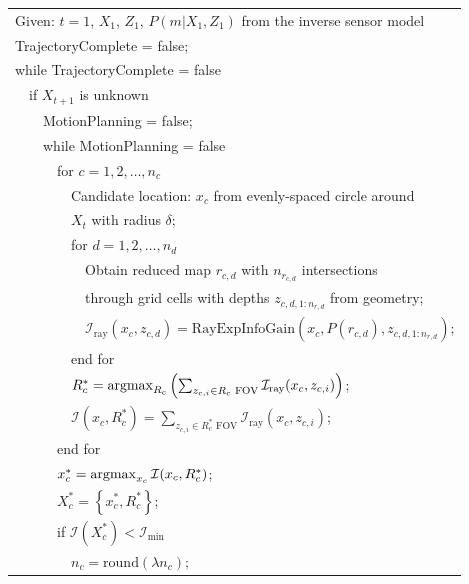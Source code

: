 \documentclass[letterpaper, 10pt]{ieeeconf}
\newcommand{\braces}[1]{\ensuremath{\left\{ #1 \right\}}}
\newcommand{\argmax}{\operatornamewithlimits{argmax}}
\begin{document}
\begin{table}
\begin{tabular}{ l }
  Given: $t=1$, $X_{1}$, $Z_{1}$, $P(m|X_{1},Z_{1})$ from the inverse sensor model\\
  TrajectoryComplete = false;\\
  while TrajectoryComplete = false\\
  \ \ if $X_{t+1}$ is unknown\\
  \ \ \ \ MotionPlanning = false;\\
  \ \ \ \ while MotionPlanning = false\\
  \ \ \ \ \ \ for $c = 1,2,\ldots,n_c$\\
  \ \ \ \ \ \ \ \ Candidate location: $x_{c}$ from evenly-spaced circle around\\
  \ \ \ \ \ \ \ \ $X_t$ with radius $\delta$;\\
  \ \ \ \ \ \ \ \ for $d=1,2,\ldots,n_d$\\
  \ \ \ \ \ \ \ \ \ \ Obtain reduced map $r_{c,d}$ with $n_{r_{c,d}}$ intersections\\
  \ \ \ \ \ \ \ \ \ \ through grid cells with depths $z_{c,d,1:n_{r,d}}$ from geometry;\\
  \ \ \ \ \ \ \ \ \ \ $\mathcal I_\text{ray}(x_c,z_{c,d})=\text{RayExpInfoGain}(x_c,P(r_{c,d}),z_{c,d,1:n_{r,d}})$;\\
  \ \ \ \ \ \ \ \ end for\\
  \ \ \ \ \ \ \ \ $R_{c}^*=\argmax_{R_c}\left(\sum_{z_{c,i}\in R_c \text{ FOV}}\mathcal I_\text{ray}(x_c,z_{c,i})\right)$;\\%
  \ \ \ \ \ \ \ \ $\mathcal I(x_c,R_c^*)=\sum_{z_{c,i}\in R_c^* \text{ FOV}}\mathcal I_\text{ray}(x_c,z_{c,i})$;\\%
  \ \ \ \ \ \ end for\\
  \ \ \ \ \ \ $x_c^*=\argmax_{x_c}\mathcal I(x_c,R_c^*)$;\\
  \ \ \ \ \ \ $X_c^*=\braces{x_c^*,R_c^*}$;\\
  \ \ \ \ \ \ if $\mathcal I(X_c^*)<\mathcal I_\text{min}$\\
  \ \ \ \ \ \ \ \ $n_c=\text{round}(\lambda n_c)$;\\

\end{tabular}
\end{table}
\end{document}
